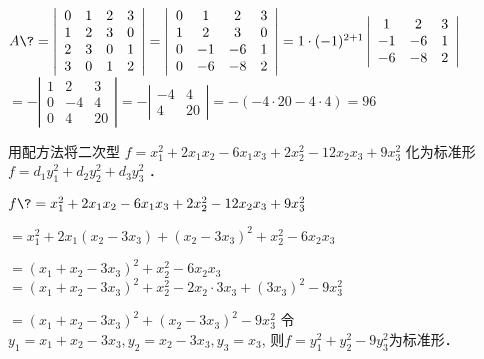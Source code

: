 \documentclass{jnuexam}
\begin{document}
\bigskip

\begin{solution}
$A \? = \left|\begin{array}{cccc}
    0 & 1 & 2 & 3\\
    1 & 2 & 3 & 0\\
    2 & 3 & 0 & 1\\
    3 & 0 & 1 & 2
  \end{array}\right| = \left|\begin{array}{cccc}
    0 & 1 & 2 & 3\\
    1 & 2 & 3 & 0\\
    0 & - 1 & - 6 & 1\\
    0 & - 6 & - 8 & 2
  \end{array}\right| = 1 \cdot (- 1)^{2 + 1} \left|\begin{array}{ccc}
    1 & 2 & 3\\
    - 1 & - 6 & 1\\
    - 6 & - 8 & 2
  \end{array}\right|$ 
\+ $= -\left|\begin{array}{ccc}
    1 & 2 & 3\\
    0 & - 4 & 4\\
    0 & 4 & 20
  \end{array}\right| = - \left|\begin{array}{cc}
    - 4 & 4\\
    4 & 20
  \end{array}\right| = -(-4\cdot20-4\cdot4) = 96$ 
\end{solution}

\vfill

\begin{problem}
用配方法将二次型 $f = x_1^2 + 2 x_1 x_2 - 6 x_1 x_3 + 2 x_2^2 - 12
x_2 x_3 + 9 x^2_3$ 化为标准形 $f = d_1 y^2_1 + d_2 y^2_2 + d_3 y^2_3$ ．
\end{problem}

\bigskip

\begin{solution}
$f \? = x_1^2 + 2 x_1 x_2 - 6 x_1 x_3 + 2 x_2^2 - 12 x_2 x_3 + 9 x^2_3$ \par
  \+ $= x_1^2 + 2 x_1 (x_2 - 3 x_3) + (x_2 - 3 x_3)^2 + x_2^2 - 6 x_2 x_3 $ \par
  \+ $= (x_1 + x_2 - 3 x_3)^2 + x_2^2 - 6 x_2 x_3$ 
  \+ $= (x_1 + x_2 - 3 x_3)^2 + x_2^2 - 2 x_2 \cdot 3 x_3 + (3 x_3)^2 - 9x_3^2$ \par
  \+ $= (x_1 + x_2 - 3 x_3)^2 + (x_2 - 3 x_3)^2 - 9 x_3^2$ 
令$y_1 = x_1 + x_2 - 3 x_3, y_2 = x_2 - 3 x_3, y_3 = x_3$, \newline
则$f = y_1^2 + y_2^2 - 9y_3^2$为标准形．
\end{solution}
\end{document}

